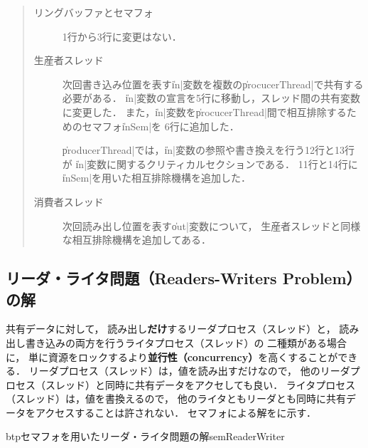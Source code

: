 \begin{quote}
\begin{description}
\item [リングバッファとセマフォ]
1行から3行に変更はない．

\item [生産者スレッド]
次回書き込み位置を表す\|in|変数を複数の\|procucerThread|で共有する必要がある．
\|in|変数の宣言を5行に移動し，スレッド間の共有変数に変更した．
また，\|in|変数を\|procucerThread|間で相互排除するためのセマフォ\|inSem|を
6行に追加した．

\|producerThread|では，\|in|変数の参照や書き換えを行う12行と13行が
\|in|変数に関するクリティカルセクションである．
11行と14行に\|inSem|を用いた相互排除機構を追加した．

\item [消費者スレッド]
次回読み出し位置を表す\|out|変数について，
生産者スレッドと同様な相互排除機構を追加してある．
\end{description}
\end{quote}

\subsection{リーダ・ライタ問題（Readers-Writers Problem）の解}
\label{readersWritersProglem}
共有データに対して，
読み出し{\bf だけ}するリーダプロセス（スレッド）と，
読み出し書き込みの両方を行うライタプロセス（スレッド）の
二種類がある場合に，
単に資源をロックするより{\bf 並行性（concurrency）}を高くすることができる．
リーダプロセス（スレッド）は，値を読み出すだけなので，
他のリーダプロセス（スレッド）と同時に共有データをアクセしても良い．
ライタプロセス（スレッド）は，値を書換えるので，
他のライタともリーダとも同時に共有データをアクセスすることは許されない．
セマフォによる解をに示す．

\begin{myfig}{btp}{セマフォを用いたリーダ・ライタ問題の解}{semReaderWriter}

\end{myfig}

